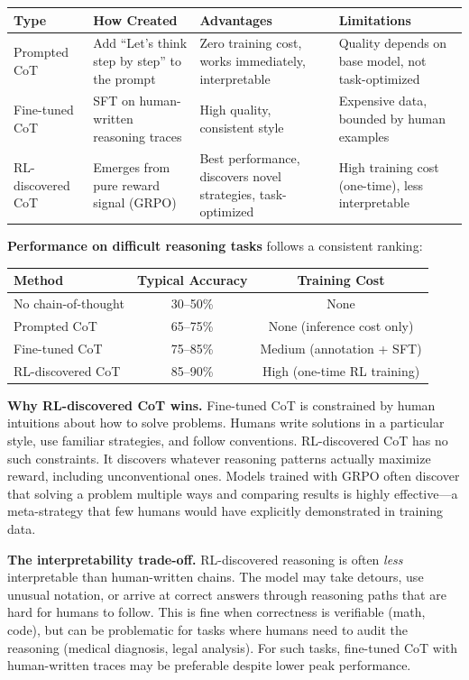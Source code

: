 \begin{chapterenv}
\begin{center}
\begin{tabular}{p{}p{}p{}p{}}
\toprule
\textbf{Type} & \textbf{How Created} & \textbf{Advantages} & \textbf{Limitations} \\
\midrule
Prompted CoT & Add ``Let's think step by step'' to the prompt & Zero training cost, works immediately, interpretable & Quality depends on base model, not task-optimized \\
Fine-tuned CoT & SFT on human-written reasoning traces & High quality, consistent style & Expensive data, bounded by human examples \\
RL-discovered CoT & Emerges from pure reward signal (GRPO) & Best performance, discovers novel strategies, task-optimized & High training cost (one-time), less interpretable \\
\bottomrule
\end{tabular}
\end{center}

\textbf{Performance on difficult reasoning tasks} follows a consistent ranking:

\begin{center}
\begin{tabular}{lcc}
\toprule
\textbf{Method} & \textbf{Typical Accuracy} & \textbf{Training Cost} \\
\midrule
No chain-of-thought & 30--50\% & None \\
Prompted CoT & 65--75\% & None (inference cost only) \\
Fine-tuned CoT & 75--85\% & Medium (annotation + SFT) \\
RL-discovered CoT & 85--90\% & High (one-time RL training) \\
\bottomrule
\end{tabular}
\end{center}

\textbf{Why RL-discovered CoT wins.} Fine-tuned CoT is constrained by human intuitions about how to solve problems. Humans write solutions in a particular style, use familiar strategies, and follow conventions. RL-discovered CoT has no such constraints. It discovers whatever reasoning patterns actually maximize reward, including unconventional ones. Models trained with GRPO often discover that solving a problem multiple ways and comparing results is highly effective---a meta-strategy that few humans would have explicitly demonstrated in training data.

\textbf{The interpretability trade-off.} RL-discovered reasoning is often \textit{less} interpretable than human-written chains. The model may take detours, use unusual notation, or arrive at correct answers through reasoning paths that are hard for humans to follow. This is fine when correctness is verifiable (math, code), but can be problematic for tasks where humans need to audit the reasoning (medical diagnosis, legal analysis). For such tasks, fine-tuned CoT with human-written traces may be preferable despite lower peak performance.


\end{chapterenv}
